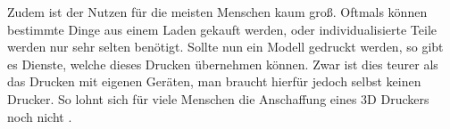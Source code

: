 Zudem ist der Nutzen für die meisten Menschen kaum groß. Oftmals können bestimmte Dinge aus einem Laden gekauft werden, oder individualisierte Teile werden nur sehr selten benötigt. Sollte nun ein Modell gedruckt werden, so gibt es Dienste, welche dieses Drucken übernehmen können. Zwar ist dies teurer als das Drucken mit eigenen Geräten, man braucht hierfür jedoch selbst keinen Drucker. So lohnt sich für viele Menschen die Anschaffung eines 3D Druckers noch nicht \parencite[Informationen aus:][]{PRIV_USE}.
